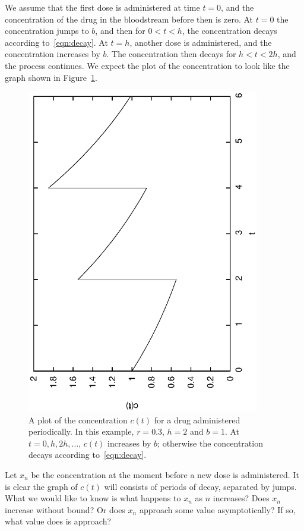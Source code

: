 We assume that the first dose is administered at time $t=0$, and
the concentration of the drug in the bloodstream before then
is zero.  At $t=0$ the concentration jumps to $b$, and then
for $0 < t < h$, the concentration decays according
to~\eqref{eqn:decay}.  At $t=h$, another dose is administered,
and the concentration increases by $b$. The concentration then decays
for $h < t < 2h$, and the process continues.
We expect the plot of the concentration to look like
the graph shown in Figure~\ref{fig:PeriodicDrugDosePlot}.
\begin{figure}
\centerline{%
\includegraphics[angle=270,width=4in]{python_PeriodicDrugDose/PeriodicDrugDosePlot.eps}
}
\caption{A plot of the concentration $c(t)$ for a drug administered
periodically.  In this example, $r=0.3$, $h=2$ and $b=1$.
At $t=0, h, 2h, \ldots$, $c(t)$ increases by $b$; otherwise
the concentration decays according to~\eqref{eqn:decay}.}
\label{fig:PeriodicDrugDosePlot}
\end{figure}


Let $x_n$ be the concentration at the moment before
a new dose is administered.
It is clear the graph of $c(t)$ will consists of
periods of decay, separated by jumps.  What we would like to
know is what happens to $x_n$ as $n$ increases?
Does $x_n$ increase without bound? Or does $x_n$ approach
some value asymptotically?  If so, what value does is approach?

